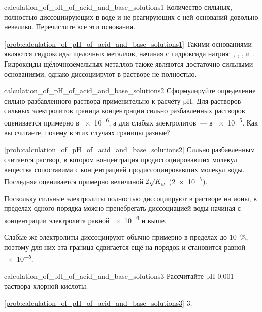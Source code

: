 \begin{problem}{}{calculation_of_pH_of_acid_and_base_solutions1}
    Количество сильных, полностью диссоциирующих в воде и не реагирующих с ней оснований довольно невелико. Перечислите все эти основания.
    \begin{sol}{\ref{prob:calculation_of_pH_of_acid_and_base_solutions1}}
        Такими основаниями являются гидроксиды щелочных металлов, начиная с гидроксида натрия: , , ,  и . Гидроксиды щёлочноземельных металлов также являются достаточно сильными основаниями, однако диссоциируют в растворе не полностью.
    \end{sol}
\end{problem}

\begin{problem}{}{calculation_of_pH_of_acid_and_base_solutions2}
    Сформулируйте определение сильно разбавленного раствора применительно к расчёту pH. Для растворов сильных электролитов граница концентрации сильно разбавленных растворов оценивается примерно в \qty{e-6}{\ruMolar}, а для слабых электролитов~--- в \qty{e-5}{\ruMolar}. Как вы считаете, почему в этих случаях границы разные?
    \begin{sol}{\ref{prob:calculation_of_pH_of_acid_and_base_solutions2}}
        Сильно разбавленным считается раствор, в котором концентрация продиссоциировавших молекул вещества сопоставима с концентрацией продиссоциировавших молекул воды. Последняя оценивается примерно величиной $2\sqrt{K_w}$ (\qty{2e-7}{\ruMolar}).

        Поскольку сильные электролиты полностью диссоциируют в растворе на ионы, в пределах одного порядка можно пренебрегать диссоциацией воды начиная с концентрации электролита равной \qty{e-6}{\ruMolar} и выше.

        Слабые же электролиты диссоциируют обычно примерно в пределах до \qty{10}{\percent}, поэтому для них эта граница сдвигается ещё на порядок и становится равной \qty{e-5}{\ruMolar}.
    \end{sol}
\end{problem}

\begin{problem}{}{calculation_of_pH_of_acid_and_base_solutions3}
    Рассчитайте pH \qty{0,001}{\ruMolar} раствора хлорной кислоты.
    \begin{sol}{\ref{prob:calculation_of_pH_of_acid_and_base_solutions3}}
        3.
    \end{sol}
\end{problem}

